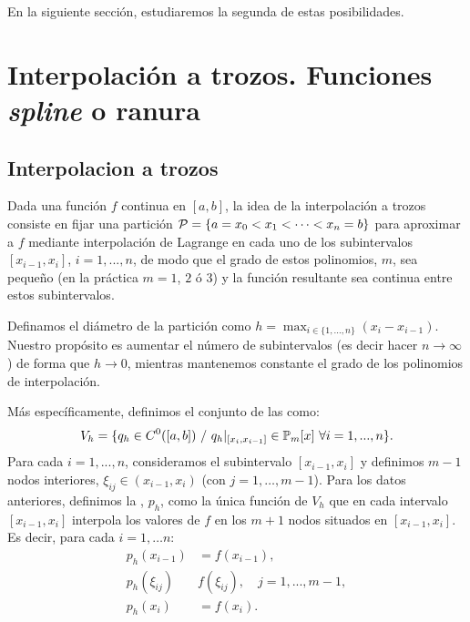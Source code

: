     En la siguiente sección, estudiaremos la segunda de estas
    posibilidades.

    \section{Interpolación a trozos. Funciones \textit{spline} o ranura}
    \label{sec:interp-trozos-splines}

    \subsection{Interpolacion a trozos}
    \label{sec:interpolacion-trozos}


    Dada una función $f$ continua en $[a,b]$, la idea de la interpolación
    a trozos consiste en fijar una partición ${\cal
      P}=\{a=x_0<x_1<\cdots<x_n=b\}$ para aproximar a $f$ mediante
    interpolación de Lagrange en cada uno de los subintervalos
    $[x_{i-1},x_{i}]$, $i=1,...,n$, de modo que el grado de estos
    polinomios, $m$, sea pequeño (en la práctica $m=1$, $2$ ó $3$) y la
    función resultante sea continua entre estos subintervalos.

    Definamos el diámetro de la partición como
    $h=\max_{i\in\{1,...,n\}}(x_i-x_{i-1})$. Nuestro propósito es aumentar
    el número de subintervalos (es decir hacer $n\to \infty$) de forma
    que $h\to 0$, mientras mantenemos constante el grado de los polinomios
    de interpolación.

    Más específicamente, definimos el conjunto de las  como:
    \begin{equation*}
      V_h = \{ q_h\in C^0([a,b]) \ /\ q_h|_{[x_i,x_{i-1}]}\in \Pol_m[x]\
      \forall i=1,...,n \}.
    \end{equation*}
    Para cada $i=1,...,n$, consideramos el subintervalo $[x_{i-1},x_i]$ y
    definimos $m-1$ nodos interiores, $\xi_{ij}\in (x_{i-1},x_i)$ (con
    $j=1,\dots,m-1$). Para los datos anteriores, definimos la
    , $p_h$, como
    la única función de $V_h$ que en cada intervalo $[x_{i-1},x_i]$
    interpola los valores de $f$ en los $m+1$ nodos situados en $[x_{i-1},
    x_{i}]$.  Es decir, para cada $i=1,\dots n$:
    \begin{align*}
    p_h(x_{i-1})&=f(x_{i-1}),\\
    p_h(\xi_{ij})&f(\xi_{ij}), \quad j=1,...,m-1,\\
    p_h(x_i)&=f(x_i).
    \end{align*}

